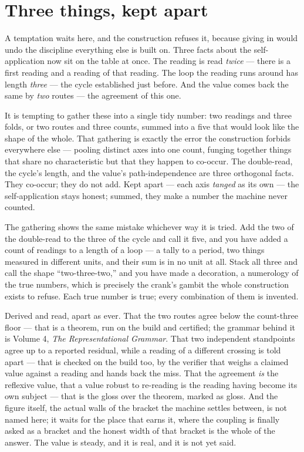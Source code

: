 \section{Three things, kept apart}

A temptation waits here, and the construction refuses it, because giving in would undo the discipline everything else is built
on.
Three facts about the self-application now sit on the table at once.
The reading is read \emph{twice} --- there is a first reading and a reading of that reading.
The loop the reading runs around has length \emph{three} --- the cycle established just before.
And the value comes back the same by \emph{two} routes --- the agreement of this one.

It is tempting to gather these into a single tidy number: two readings and three folds, or two routes and three counts,
summed into a five that would look like the shape of the whole.
That gathering is exactly the error the construction forbids everywhere else --- pooling distinct axes into one count, funging
together things that share no characteristic but that they happen to co-occur.
The double-read, the cycle's length, and the value's path-independence are three orthogonal facts.
They co-occur; they do not add.
Kept apart --- each axis \emph{tanged} as its own --- the self-application stays honest; summed, they make a number the machine never
counted.

The gathering shows the same mistake whichever way it is tried.
Add the two of the double-read to the three of the cycle and call it five, and you have added a count of readings to a
length of a loop --- a tally to a period, two things measured in different units, and their sum is in no unit at all.
Stack all three and call the shape ``two-three-two,'' and you have made a decoration, a numerology of the true numbers,
which is precisely the crank's gambit the whole construction exists to refuse.
Each true number is true; every combination of them is invented.

Derived and read, apart as ever.
That the two routes agree below the count-three floor --- that is a theorem, run on the build and certified; the grammar behind it is Volume 4, \emph{The Representational Grammar}.
That two independent standpoints agree up to a reported residual, while a reading of a different crossing is told apart ---
that is checked on the build too, by the verifier that weighs a claimed value against a reading and hands back the miss.
That the agreement \emph{is} the reflexive value, that a value robust to re-reading is the reading having become its own
subject --- that is the gloss over the theorem, marked as gloss.
And the figure itself, the actual walls of the bracket the machine settles between, is not named here; it waits for the
place that earns it, where the coupling is finally asked as a bracket and the honest width of that bracket is the whole
of the answer.
The value is steady, and it is real, and it is not yet said.
